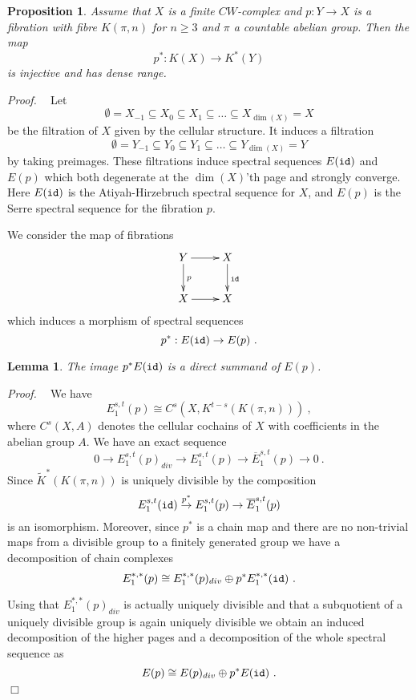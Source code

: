 \documentclass[12pt]{article}
\newtheorem{prop}[theorem]{Proposition}
\newtheorem{lem}[theorem]{Lemma}
\newcommand{\id}{{\tt id}}
\def\hB{\hspace*{\fill}$\Box$ \newline\noindent}
\newcommand{\proof}{{\it Proof.$\:\:\:\:$}}
\begin{document}
   


\begin{prop}\label{mirette4}
Assume that $X$ is a finite $CW$-complex and $p:Y\to X$ is a fibration with fibre
$K(\pi,n)$ for $n\ge 3$ and $\pi$ a countable abelian group.
Then the map \begin{equation}\label{mirette1}p^{*}:  K(X)\to   K^{*}(Y)\end{equation}  is injective and has dense range.
\end{prop}
\proof
Let $$\emptyset=X_{-1}\subseteq X_{0}\subseteq X_{1}\subseteq \dots\subseteq X_{\dim(X)}=X$$
be the filtration of $X$ given by the cellular structure. It induces a filtration
$$\emptyset=Y_{-1}\subseteq Y_{0}\subseteq Y_{1}\subseteq \dots\subseteq Y_{\dim(X)}=Y$$
by taking preimages. These filtrations induce spectral sequences
$E(\id)$ and $E(p)$ which both degenerate at the $\dim(X)$'th page and strongly converge. Here $E(\id)$ is the Atiyah-Hirzebruch spectral sequence for $X$, and $E(p)$ is the Serre spectral sequence
for the fibration $p$.

 
 
 We consider the map of fibrations
$$\xymatrix{Y\ar[r]\ar[d]^{p}&X\ar[d]^{\id}\\X\ar[r]&X}$$
which induces a morphism of  spectral sequences 
$$p^{*}:E(\id)\to E(p)\ .$$
\begin{lem}\label{mirette40}
The image $p^{*}E(\id)$ is a direct summand of $E(p)$. 
\end{lem}
\proof
We have  
 $$E^{s,t}_{1}(p)\cong C^{s}(X,K^{t-s}(K(\pi,n)))\ ,$$ 
 where $C^{s}(X,A)$ denotes the cellular cochains of $X$ with coefficients in the abelian group $A$.
  We have an exact sequence
$$0\to E_{1}^{s,t}(p)_{div}\to E_{1}^{s,t}(p)\to \overline E_{1}^{s,t}(p) \to 0\ .$$
Since $\tilde K^{*}(K(\pi,n))$ is uniquely divisible by
\cite[Thm. II]{MR0231369} the composition
$$E_{1}^{s,t}(\id)\stackrel{p^{*}}{\to}E_{1}^{s,t} (p)\to \overline E_{1}^{s,t}(p)$$ is an isomorphism. 
  Moreover, since $p^{*}$ is a chain map and there are no non-trivial maps from a divisible group to a finitely generated group we have a decomposition of chain complexes
$$E_{1}^{*,*}(p)\cong E_{1}^{*,*}(p)_{div}\oplus p^{*}E_{1}^{*,*}(\id)\ .$$
 
 Using that $E_{1}^{*,*}(p)_{div}$ is actually uniquely divisible and that a subquotient of a uniquely divisible group is again uniquely divisible we obtain an induced  decomposition of the
  higher pages and  a decomposition of the whole spectral sequence as
$$E(p)\cong E(p)_{div}\oplus p^{*}E(\id)\ .$$
\hB 
\end{document}
